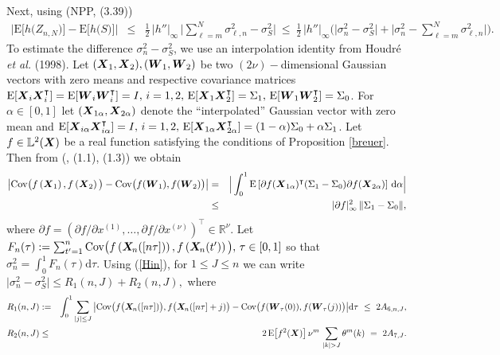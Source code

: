 \documentclass[10pt]{article}
\def\L{\mathbb{L}}
\def\R{\mathbb{R}}
\def\d{\mathrm d}
\def\E{\mathrm E}
\newcommand{\mbf}[1]{\mbox{\boldmath $#1$}}
\newcommand{\Cov}{\mbox{Cov}}
\def\Cov{\mathrm{Cov}}
\begin{document}
Next, using (NPP, (3.39))
\begin{eqnarray*}
\nonumber \Big| \E \big [h\big ( Z_{n,N} \big) \big ]-\E \big [h\big ( S\big) \big ] \Big|
&\leq &\frac 1 2 \,  |h''|_\infty \, \Big| \sum_{\ell=m}^N \sigma^2_{\ell,n} -\sigma_S^2\Big| \
\leq \ \frac 1 2 \,  |h''|_\infty \Big( \big|\sigma^2_{n} -\sigma_S^2\big| + \Big|\sigma^2_n -  \sum_{\ell=m}^N \sigma^2_{\ell,n} \Big|\Big).
\end{eqnarray*} 
To estimate the difference $\sigma^2_{n} -\sigma_S^2$,
we use an interpolation identity from Houdr\'e {\it et al.} (1998). Let
$({\mbf X}_1, {\mbf X}_2), ({\mbf W}_1, {\mbf W}_2)$  be two $(2\nu)-$dimensional Gaussian vectors with zero means
and respective covariance matrices $\E [{\mbf X}_i {\mbf X}_i^\intercal]
= \E [{\mbf W}_i {\mbf W}_i^\intercal] = I, \, i=1,2, \, \E [{\mbf X}_1 {\mbf X}_2^\intercal] = \Sigma_1,\,
\E [{\mbf W}_1 {\mbf W}_2^\intercal] = \Sigma_0 $. For $\alpha \in [0,1]$ let
$({\mbf X}_{1\alpha}, {\mbf X}_{2\alpha})$ denote  the ``interpolated''  Gaussian vector with
zero mean and   $\E [{\mbf X}_{i\alpha} {\mbf X}_{i\alpha}^\intercal] = I, \, i=1,2, \,
 \E [{\mbf X}_{1\alpha} {\mbf X}_{2\alpha}^\intercal] = (1-\alpha) \Sigma_0 + \alpha \Sigma_1 $.
Let $ f \in \L^2({\mbf X})$ be a real  function satisfying the conditions of Proposition \ref{breuer}.
Then from (\cite{Houd}, (1.1), (1.3)) we obtain
\begin{eqnarray}
\big|\Cov\big (f\left({\mbf
X}_1 \right), f\left({\mbf
X}_2 \right)\big) - {\rm Cov}\big(
f({\mbf W}_1), f({\mbf W}_2)\big)\big|&=&\Big|
\int_0^1 \E \left[\partial f({\mbf X}_{1 \alpha})^\intercal  (\Sigma_1 - \Sigma_0) \partial f({\mbf X}_{2 \alpha}) \right]
\,{\rm d}\alpha \Big| \nonumber \\
&\le&|\partial f|_\infty^2 \, \|\Sigma_1 - \Sigma_0\|,  \label{Hin}
\end{eqnarray}
where $\partial f = (\partial f/\partial x^{(1)}, \dots, \partial f/\partial x^{(\nu)})^\intercal \in \R^\nu.  $
Let $F_n(\tau) := \sum_{t'=1}^n  \Cov\big (f\left({\mbf
X}_{\! n}([n\tau]) \right), f\left({\mbf
X}_{\! n}(t') \right)\big), \, \tau \in [0,1]    $  so that $ \sigma^2_{n} = \int_0^1 F_n(\tau) {\d} \tau. $
Using (\ref{Hin}), for $1\le J \le n$ we can write $\big |\sigma^2_{n}  -\sigma_S^2 \big| \le R_1(n,J) + R_2(n,J), $ where
\begin{eqnarray*}
R_1(n,J)
&:=&\int_0^1 \sum_{|j| \le J} \big|\Cov\big (f\big({\mbf
X}_{\! n}([n\tau]) \big), f\big({\mbf
X}_{\! n}([n\tau] +j) \big) - \Cov\big( f({\mbf W}_\tau(0)), f({\mbf W}_\tau(j))\big)\big| {\rm d} \tau \ \le \ 2 A_{6,n,J},\\
R_2(n,J)&\le&2\, \E \big [ f^2({\mbf X})\big ]   \,\nu^m \,  \sum_{|k|>J} \theta^m(k) \ = \ 2 A_{7, J}.
\end{eqnarray*}
\end{document}
